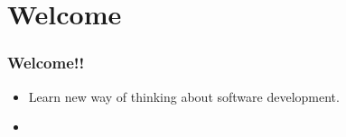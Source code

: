 \section{Welcome}

\begin{frame}
  \frametitle{Welcome!!}
  \begin{itemize}
    \item Learn new way of thinking about software development.
    \item 
  \end{itemize}
\end{frame}